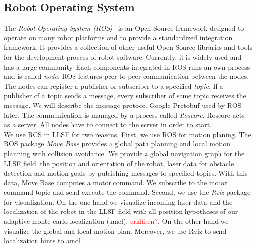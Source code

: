 \subsection{Robot Operating System}
The \textit{Robot Operating System (ROS)}~\cite{Ros} is an Open Source framework designed to operate on many robot platforms and to provide a standardized integration framework. It provides a collection of other useful Open Source libraries and tools for the development process of robot-software. Currently, it is widely used and has a large community. Each components integrated in ROS runs an own process and is called \textit{node}. ROS features peer-to-peer communication between the nodes. The nodes can register a publisher or subscriber to a specified \textit{topic}. If a publisher of a topic sends a message, every subscriber of same topic receives the message. We will describe the message protocol Google Protobuf used by ROS later. The communication is managed by a process called \textit{Roscore}. Roscore acts as a server. All nodes have to connect to the server in order to start.\\
We use ROS in LLSF for two reasons. First, we use ROS for motion planing. The ROS package \textit{Move Base} provides a global path planning and local motion planning with collision avoidance. We provide a global navigation graph for the LLSF field, the position and orientation of the robot, laser data for obstacle detection and motion goals by publishing messages to specified topics. With this data, Move Base computes a motor command. We subscribe to the motor command topic and send execute the command. Second, we use the \textit{Rviz} package for visualization. On the one hand we visualize incoming laser data and the localization of the robot in the LLSF field with all position hypotheses of our adaptive monte carlo localization (amcl). \textcolor{red}{erklären?}. On the other hand we visualize the global and local motion plan. Moreover, we use Rviz to send localization hints to amcl.

